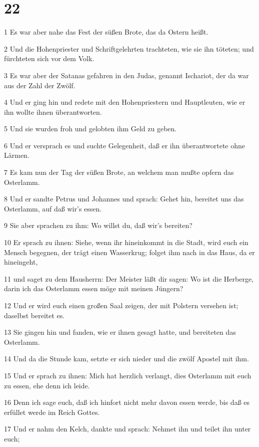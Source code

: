 \chapter{22}

\par 1 Es war aber nahe das Fest der süßen Brote, das da Ostern heißt.
\par 2 Und die Hohenpriester und Schriftgelehrten trachteten, wie sie ihn töteten; und fürchteten sich vor dem Volk.
\par 3 Es war aber der Satanas gefahren in den Judas, genannt Ischariot, der da war aus der Zahl der Zwölf.
\par 4 Und er ging hin und redete mit den Hohenpriestern und Hauptleuten, wie er ihn wollte ihnen überantworten.
\par 5 Und sie wurden froh und gelobten ihm Geld zu geben.
\par 6 Und er versprach es und suchte Gelegenheit, daß er ihn überantwortete ohne Lärmen.
\par 7 Es kam nun der Tag der süßen Brote, an welchem man mußte opfern das Osterlamm.
\par 8 Und er sandte Petrus und Johannes und sprach: Gehet hin, bereitet uns das Osterlamm, auf daß wir's essen.
\par 9 Sie aber sprachen zu ihm: Wo willst du, daß wir's bereiten?
\par 10 Er sprach zu ihnen: Siehe, wenn ihr hineinkommt in die Stadt, wird euch ein Mensch begegnen, der trägt einen Wasserkrug; folget ihm nach in das Haus, da er hineingeht,
\par 11 und saget zu dem Hausherrn: Der Meister läßt dir sagen: Wo ist die Herberge, darin ich das Osterlamm essen möge mit meinen Jüngern?
\par 12 Und er wird euch einen großen Saal zeigen, der mit Polstern versehen ist; daselbst bereitet es.
\par 13 Sie gingen hin und fanden, wie er ihnen gesagt hatte, und bereiteten das Osterlamm.
\par 14 Und da die Stunde kam, setzte er sich nieder und die zwölf Apostel mit ihm.
\par 15 Und er sprach zu ihnen: Mich hat herzlich verlangt, dies Osterlamm mit euch zu essen, ehe denn ich leide.
\par 16 Denn ich sage euch, daß ich hinfort nicht mehr davon essen werde, bis daß es erfüllet werde im Reich Gottes.
\par 17 Und er nahm den Kelch, dankte und sprach: Nehmet ihn und teilet ihn unter euch;
